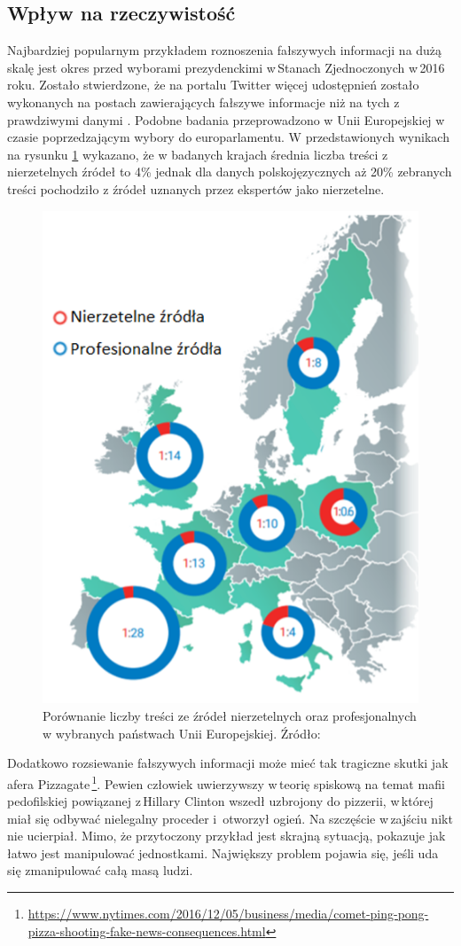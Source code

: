 \subsection{Wpływ na rzeczywistość}
Najbardziej popularnym przykładem roznoszenia fałszywych informacji na dużą skalę jest okres przed wyborami prezydenckimi w\,Stanach Zjednoczonych w\,2016 roku. Zostało stwierdzone, że na portalu Twitter więcej udostępnień zostało wykonanych na postach zawierających fałszywe informacje niż na tych z\,prawdziwymi danymi  \cite{neudertpolarization2018}. Podobne badania przeprowadzono w Unii Europejskiej w czasie poprzedzającym wybory do europarlamentu. W przedstawionych wynikach na rysunku \ref{fig:EUMapJunkNews} wykazano, że w badanych krajach średnia liczba treści z nierzetelnych źródeł to 4\% jednak dla danych polskojęzycznych aż 20\% zebranych treści pochodziło z źródeł uznanych przez ekspertów jako nierzetelne\cite{marchal2019junk}.
\begin{figure}[!h]
	
	\centering \includegraphics[width=0.5\linewidth]{img/EUMapJunkNews.PNG}
	\caption{Porównanie liczby treści ze źródeł nierzetelnych oraz profesjonalnych w wybranych państwach Unii Europejskiej. Źródło: \cite{marchal2019junk}}
	\label{fig:EUMapJunkNews}
\end{figure}
\par
Dodatkowo rozsiewanie fałszywych informacji może mieć tak tragiczne skutki jak afera Pizzagate\,\footnote{\url{https://www.nytimes.com/2016/12/05/business/media/comet-ping-pong-pizza-shooting-fake-news-consequences.html}}. Pewien człowiek uwierzywszy w\,teorię spiskową na temat mafii pedofilskiej powiązanej z\,Hillary Clinton wszedł uzbrojony do pizzerii, w\,której miał się odbywać nielegalny proceder i \,otworzył ogień. Na szczęście w\,zajściu nikt nie ucierpiał. Mimo, że przytoczony przykład jest skrajną sytuacją, pokazuje jak łatwo jest manipulować jednostkami. Największy problem pojawia się, jeśli uda się zmanipulować całą masą ludzi. 
